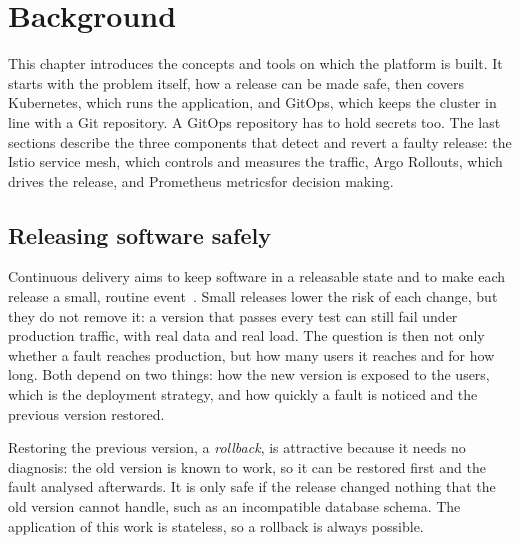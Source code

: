 \chapter{Background}
\label{sec:Background}
This chapter introduces the concepts and tools on which the platform is built. It starts with the problem itself, how a release can be made safe, then covers Kubernetes, which runs the application, and GitOps, which keeps the cluster in line with a Git repository. A GitOps repository has to hold secrets too. The last sections describe the three components that detect and revert a faulty release: the Istio service mesh, which controls and measures the traffic, Argo Rollouts, which drives the release, and Prometheus metricsfor decision making.

\section{Releasing software safely}
\label{sec:BgReleases}
Continuous delivery aims to keep software in a releasable state and to make each release a small, routine event~\cite{Humble10}. Small releases lower the risk of each change, but they do not remove it: a version that passes every test can still fail under production traffic, with real data and real load. The question is then not only whether a fault reaches production, but how many users it reaches and for how long. Both depend on two things: how the new version is exposed to the users, which is the deployment strategy, and how quickly a fault is noticed and the previous version restored.

Restoring the previous version, a \emph{rollback}, is attractive because it needs no diagnosis: the old version is known to work, so it can be restored first and the fault analysed afterwards. It is only safe if the release changed nothing that the old version cannot handle, such as an incompatible database schema. The application of this work is stateless, so a rollback is always possible.

